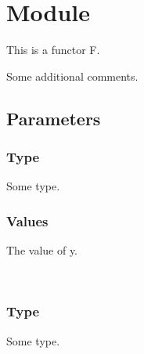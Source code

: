 \section{Module }\label{Nested-F}%
This is a functor F.

Some additional comments.

\subsection{Parameters\label{parameters}}%
\label{Nested-F-argument-1-Arg1}\begin{ocamlindent}\subsubsection{Type\label{type}}%
\label{Nested-F-argument-1-Arg1-type-t}\begin{ocamlindent}Some type.\end{ocamlindent}%
\medbreak
\subsubsection{Values\label{values}}%
\label{Nested-F-argument-1-Arg1-val-y}\begin{ocamlindent}The value of y.\end{ocamlindent}%
\medbreak
\end{ocamlindent}%
\\
\label{Nested-F-argument-2-Arg2}\begin{ocamlindent}\subsubsection{Type\label{type_2}}%
\label{Nested-F-argument-2-Arg2-type-t}\begin{ocamlindent}Some type.\end{ocamlindent}%
\medbreak
\end{ocamlindent}%
\\
